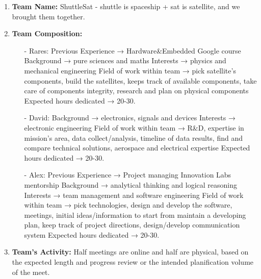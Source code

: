 \documentclass[11pt]{article}
\begin{document}
\begin{enumerate}
\item \textbf{Team Name:} {ShuttleSat - shuttle is spaceship + sat is satellite, and we brought them together.}
\item \textbf{Team Composition:}
\begin{itemize}
\item[-] {Rares: Previous Experience → Hardware\&Embedded Google course \textbar\hspace{0cm} Background → pure sciences and maths \textbar\hspace{0cm} Interests → physics and mechanical engineering \textbar\hspace{0cm} Field of work within team → pick satellite's components, build the satellites, keeps track of available components, take care of components integrity, research and plan on physical components \textbar\hspace{0cm} Expected hours dedicated → 20-30.}
\item[-] {David: Background → electronics, signals and devices \textbar\hspace{0cm} Interests → electronic engineering \textbar\hspace{0cm} Field of work within team → R\&D, expertise in mission's area, data collect/analysis, timeline of data results, find and compare technical solutions, aerospace and electrical expertise \textbar\hspace{0cm} Expected hours dedicated → 20-30.}
\item[-] {Alex: Previous Experience → Project managing Innovation Labs mentorship \textbar\hspace{0cm} Background → analytical thinking and logical reasoning \textbar\hspace{0cm} Interests → team management and software engineering \textbar\hspace{0cm} Field of work within team → pick technologies, design and develop the software, meetings, initial ideas/information to start from maintain a developing plan, keep track of project directions, design/develop communication system \textbar\hspace{0cm} Expected hours dedicated → 20-30.}
\newline
\end{itemize}

\item \textbf{Team's Activity:} {Half meetings are online and half are physical, based on the expected length and progress review or the intended planification volume of the meet.}
\end{enumerate}
\end{document}
